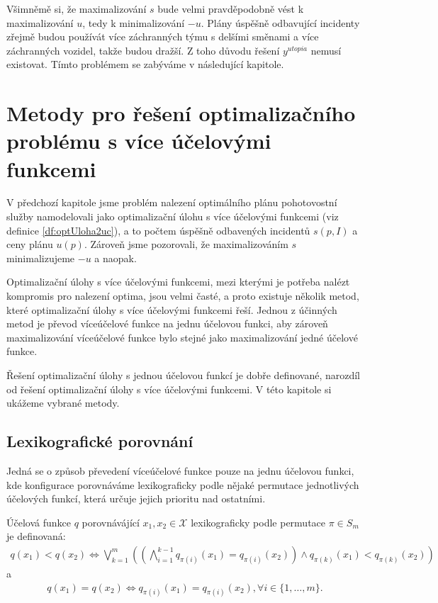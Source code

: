 Všimněmě si, že maximalizování $s$ bude velmi pravděpodobně vést k maximalizování $u$, tedy k minimalizování $-u$.
Plány úspěšně odbavující incidenty zřejmě budou používát více záchranných týmu s delšími směnami a více záchranných vozidel, takže budou dražší.
Z toho důvodu řešení $y^{utopia}$ nemusí existovat. Tímto problémem se zabýváme v následující kapitole.

\section{Metody pro řešení optimalizačního problému s více účelovými funkcemi}\label{kap:metodyProReseniOptSViceUcel}

V předchozí kapitole jsme problém nalezení optimálního plánu pohotovostní služby namodelovali jako optimalizační úlohu s více účelovými funkcemi (viz definice \ref{df:optUloha2uc}),
a to počtem úspěšně odbavených incidentů $s(p, I)$ a ceny plánu $u(p)$.
Zároveň jsme pozorovali, že maximalizováním $s$ minimalizujeme $-u$ a naopak.

Optimalizační úlohy s více účelovými funkcemi, mezi kterými je potřeba nalézt kompromis pro nalezení optima, jsou velmi časté,
a proto existuje několik metod, které optimalizační úlohy s více účelovými funkcemi řeší.
Jednou z účinných metod je převod víceúčelové funkce na jednu účelovou funkci, aby
zároveň maximalizování víceúčelové funkce bylo stejné jako maximalizování jedné účelové funkce.

Řešení optimalizační úlohy s jednou účelovou funkcí je dobře definované,
narozdíl od řešení optimalizační úlohy s více účelovými funkcemi.
V této kapitole si ukážeme vybrané metody.

\subsection{Lexikografické porovnání}

Jedná se o způsob převedení víceúčelové funkce pouze na jednu účelovou funkci, kde konfigurace porovnáváme lexikograficky podle nějaké permutace jednotlivých účelových funkcí,
která určuje jejich prioritu nad ostatními.

\begin{definice}\label{df:lexPorovnani}
  Účelová funkce $q$ porovnávájící $x_1, x_2 \in \mathcal{X}$ lexikograficky podle permutace $\pi \in S_m$ je definovaná:
  \begin{align*}
    q(x_1) < q(x_2) \Leftrightarrow \bigvee_{k=1}^m \left ( \left ( \bigwedge_{i=1}^{k-1} q_{\pi(i)}(x_1) = q_{\pi(i)}(x_2) \right ) \land q_{\pi(k)}(x_1) < q_{\pi(k)}(x_2) \right )
  \end{align*}
  a 
  \begin{align*}
    q(x_1) = q(x_2) \Leftrightarrow q_{\pi(i)}(x_1) = q_{\pi(i)}(x_2), \forall i \in \{ 1, \dots, m \}.
  \end{align*}
\end{definice}


